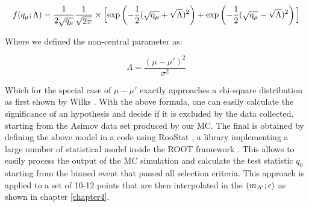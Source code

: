\begin{equation}
  \label{eq:p-value-asym}
  f(q_{\mu}; \Lambda) = \frac{1}{2\sqrt{q_{\mu}}} \frac{1}{\sqrt{2\pi}} \times \Big[ \rm{exp}\left(-\frac{1}{2} (\sqrt{q_{\mu}} + \sqrt{\Lambda})^2 \right) + \rm{exp}\left(-\frac{1}{2} (\sqrt{q_{\mu}} - \sqrt{\Lambda})^2 \right) \Big]
\end{equation}

Where we defined the non-central parameter as:

\begin{equation}
  \label{eq:non-central-par}
  \Lambda = \frac{(\mu - \mu')^2}{\sigma^2}
\end{equation}

Which for the special case of $\mu - \mu'$ exactly approaches a chi-square distribution as first shown by Wilks \cite{10.2307/2957648}. With the above formula, one can easily calculate the significance of an hypothesis and decide if it is excluded by the data collected, starting from the Asimov data set produced by our MC. The final is obtained by defining the above model in a code using RooStat \cite{moneta2010roostats}, a library implementing a large number of statistical model inside the ROOT framework \cite{root}. This allows to easily process the output of the MC simulation and calculate the test statistic $q_0$ starting from the binned event that passed all selection criteria. This approach is applied to a set of 10-12 points that are then interpolated in the $(m_{A'};\epsilon)$ as shown in chapter \ref{chapter4}.
